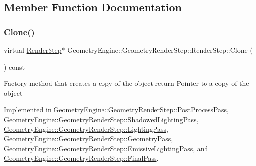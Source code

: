 \subsection{Member Function Documentation}
\mbox{\label{class_geometry_engine_1_1_geometry_render_step_1_1_render_step_afe33ea9d82c5be11f55af7d39691d44b}} 
\subsubsection{\texorpdfstring{Clone()}{Clone()}}
{\footnotesize\ttfamily virtual \mbox{\hyperlink{class_geometry_engine_1_1_geometry_render_step_1_1_render_step}{Render\+Step}}$\ast$ Geometry\+Engine\+::\+Geometry\+Render\+Step\+::\+Render\+Step\+::\+Clone (\begin{DoxyParamCaption}{ }\end{DoxyParamCaption}) const\hspace{0.3cm}{\ttfamily [pure virtual]}}

Factory method that creates a copy of the object return Pointer to a copy of the object 

Implemented in \mbox{\hyperlink{class_geometry_engine_1_1_geometry_render_step_1_1_post_process_pass_afcf20dc0a20cf1e0fb730c7b56071c26}{Geometry\+Engine\+::\+Geometry\+Render\+Step\+::\+Post\+Process\+Pass}}, \mbox{\hyperlink{class_geometry_engine_1_1_geometry_render_step_1_1_shadowed_lighting_pass_a73176d6860aee0903034eeaf93edb40d}{Geometry\+Engine\+::\+Geometry\+Render\+Step\+::\+Shadowed\+Lighting\+Pass}}, \mbox{\hyperlink{class_geometry_engine_1_1_geometry_render_step_1_1_lighting_pass_a4f1cb36c7bf6a90d0aa3b8e8feba5e5e}{Geometry\+Engine\+::\+Geometry\+Render\+Step\+::\+Lighting\+Pass}}, \mbox{\hyperlink{class_geometry_engine_1_1_geometry_render_step_1_1_geometry_pass_a12e85a0169cb7b92cb8bd7b7fe100b33}{Geometry\+Engine\+::\+Geometry\+Render\+Step\+::\+Geometry\+Pass}}, \mbox{\hyperlink{class_geometry_engine_1_1_geometry_render_step_1_1_emissive_lighting_pass_a5a46d5e73fe672e09584a2e6e8bfa5e8}{Geometry\+Engine\+::\+Geometry\+Render\+Step\+::\+Emissive\+Lighting\+Pass}}, and \mbox{\hyperlink{class_geometry_engine_1_1_geometry_render_step_1_1_final_pass_a6633ed9c32944cc390d2b0ab32225845}{Geometry\+Engine\+::\+Geometry\+Render\+Step\+::\+Final\+Pass}}.

